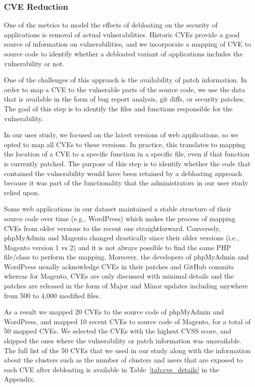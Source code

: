 \subsubsection{CVE Reduction}

One of the metrics to model the effects of debloating on the security of applications is removal of actual vulnerabilities. 
Historic CVEs provide a good source of information on vulnerabilities, and we incorporate a mapping of CVE to source code to identify whether a debloated variant of applications includes the vulnerability or not. 

One of the challenges of this approach is the availability of patch information. 
In order to map a CVE to the vulnerable parts of the source code, we use the data that is available in the form of bug report analysis, git diffs, or security patches. 
The goal of this step is to identify the files and functions responsible for the vulnerability. 

In our user study, we focused on the latest versions of web applications, so we opted to map all CVEs to these versions. 
In practice, this translates to mapping the location of a CVE to a specific function in a specific file, even if that function is currently patched. 
The purpose of this step is to identify whether the code that contained the vulnerability would have been retained by a debloating approach because it was part of the functionality that the administrators in our user study relied upon.

Some web applications in our dataset maintained a stable structure of their source code over time (e.g., WordPress) which makes the process of mapping CVEs from older versions to the recent one straightforward. 
Conversely, phpMyAdmin and Magento changed drastically since their older versions (i.e., Magento version 1 vs 2) and it is not always possible to find the same PHP file/class to perform the mapping. 
Moreover, the developers of phpMyAdmin and WordPress usually acknowledge CVEs in their patches and GitHub commits whereas for Magento, CVEs are only discussed with minimal details and the patches are released in the form of Major and Minor updates including anywhere from 500 to 4,000 modified files.

As a result we mapped 20 CVEs to the source code of phpMyAdmin and WordPress, and mapped 10 recent CVEs to source code of Magento, for a total of 50 mapped CVEs. 
We selected the CVEs with the highest CVSS score, and skipped the ones where the vulnerability or patch information was unavailable. 
The full list of the 50 CVEs that we used in our study along with the information about the \dbltr{} clusters such as the number of clusters and users that are exposed to each CVE after debloating is available in Table~\ref{tab:cve_details} in the Appendix. 

